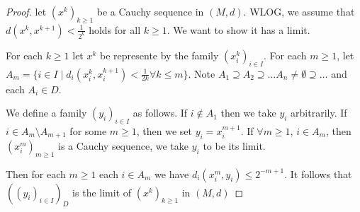 \documentclass[11pt]{article}
\begin{document}
\begin{proof}
let \((x^k)_{k\ge1}\)  be a Cauchy sequence in \((M,d)\). WLOG, we assume that
\(d(x^k,x^{k+1})<\frac{1}{2^k}\) holds for all \(k\ge1\). We want to show it has a limit.

For each \(k\ge1\) let \(x^k\) be represente by the family \((x_i^k)_{i\in I}\). For
each \(m\ge1\), let \(A_m=\{i\in I\mid d_i(x_i^k,x_i^{k+1})<\frac{1}{2k}\forall k\le m\}\).
Note \(A_1\supseteq A_2\supseteq\dots A_n\neq\emptyset\supseteq\dots\) and each \(A_i\in D\).

We define a family \((y_i)_{i\in I}\) as follows. If \(i\not\in A_1\) then we take \(y_i\)
arbitrarily. If \(i\in A_m\setminus A_{m+1}\) for some \(m\ge1\), then we set \(y_i=x_i^{m+1}\).
If \(\forall m\ge1\), \(i\in A_m\), then \((x_i^m)_{m\ge1}\) is a Cauchy sequence, we take \(y_i\) to
be its limit.

Then for each \(m\ge1\) each \(i\in A_m\) we have \(d_i(x_i^m,y_i)\le 2^{-m+1}\). It follows that
\(((y_i)_{i\in I})_{D}\) is the limit of \((x^k)_{k\ge1}\) in \((M,d)\)
\end{proof}
\end{document}
